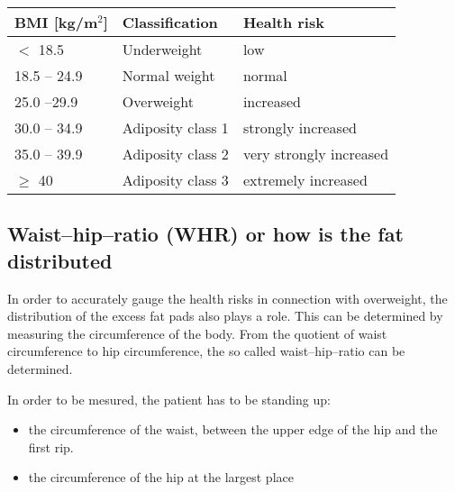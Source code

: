 \documentclass[../main.tex]{subfiles}
\begin{document}
\begin{table}[htb!]
  \centering
  \begin{tabular}{lll}
    \textbf{BMI [kg/m$^2$]} & \textbf{Classification} & \textbf{Health risk} \\
    \hline
    $<$ 18.5 & Underweight & low \\
    18.5 -- 24.9 & Normal weight & normal \\
    25.0 --29.9 & Overweight & increased \\
    30.0 -- 34.9 & Adiposity class 1 & strongly increased \\
    35.0 -- 39.9 & Adiposity class 2 & very strongly increased \\
    $\geq$ 40 & Adiposity class 3 & extremely  increased \\
  \end{tabular}
\end{table}

\subsection[Waist--hip--ratio (WHR)]{Waist--hip--ratio (WHR) or how is the fat distributed}
In order to accurately gauge the health risks in connection with overweight, the distribution of the excess fat pads also plays a role.
This can be determined by measuring the circumference of the body.
From the quotient of waist circumference to hip circumference, the so called waist--hip--ratio can be determined.


In order to be mesured, the patient has to be standing up:
\begin{itemize}
\item the circumference of the waist, between the upper edge of the hip and the first rip.
  \item the circumference of the hip at the largest place
\end{itemize}
\end{document}

